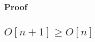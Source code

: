 \documentclass[11pt]{article}
\begin{document}
\subsubsection{Proof}


\subsection{$O[n+1] \geq O[n]$}























\end{document}

